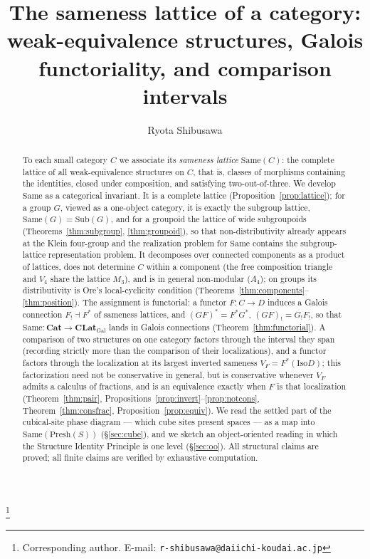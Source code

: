 \documentclass[11pt]{amsart}
\theoremstyle{definition}
\newcommand{\Same}{\mathrm{Same}}
\newcommand{\Sub}{\mathrm{Sub}}
\newcommand{\Iso}{\mathrm{Iso}}
\newcommand{\Fstar}{F^{*}}
\newcommand{\Fshriek}{F_{!}}
\newcommand{\Presh}{\mathrm{Presh}}
\newcommand{\Cat}{\mathbf{Cat}}
\newcommand{\CLatGal}{\mathbf{CLat}_{\mathrm{Gal}}}
\begin{document}
\title[The sameness lattice of a category]{The sameness lattice of a category:
  weak-equivalence structures, Galois functoriality, and comparison intervals}
\author{Ryota Shibusawa}
\thanks{Corresponding author. E-mail: \texttt{r-shibusawa@daiichi-koudai.ac.jp}}
\address{Daiichi Institute of Technology}


\begin{abstract}
To each small category $C$ we associate its \emph{sameness lattice} $\Same(C)$:
the complete lattice of all weak-equivalence structures on $C$, that is, classes
of morphisms containing the identities, closed under composition, and satisfying
two-out-of-three. We develop $\Same$ as a categorical invariant. It is a
complete lattice (Proposition~\ref{prop:lattice}); for a group $G$, viewed as a
one-object category, it is exactly the subgroup lattice, $\Same(G)=\Sub(G)$, and
for a groupoid the lattice of wide subgroupoids (Theorems~\ref{thm:subgroup},
\ref{thm:groupoid}), so that non-distributivity already appears at the Klein
four-group and the realization problem for $\Same$ contains the subgroup-lattice
representation problem. It decomposes over connected components
as a product of lattices, does not determine $C$ within a component (the free
composition triangle and $V_4$ share the lattice $M_3$), and is in general
non-modular ($A_4$); on groups its distributivity is Ore's local-cyclicity
condition (Theorems~\ref{thm:components}--\ref{thm:position}). The assignment is
functorial: a functor
$F\colon C\to D$ induces a Galois connection $\Fshriek\dashv\Fstar$ of sameness
lattices, and $(GF)^{*}=F^{*}G^{*}$, $(GF)_{!}=G_{!}F_{!}$, so that
$\Same\colon\Cat\to\CLatGal$ lands in Galois connections
(Theorem~\ref{thm:functorial}). A comparison of two structures on one category
factors through the interval they span (recording strictly more than the
comparison of their localizations), and a functor factors through the
localization at its largest inverted sameness $V_F=\Fstar(\Iso D)$; this
factorization need not be conservative in general, but is conservative whenever
$V_F$ admits a calculus of fractions, and is an equivalence exactly when $F$ is
that localization (Theorem~\ref{thm:pair},
Propositions~\ref{prop:invert}--\ref{prop:notcons},
Theorem~\ref{thm:consfrac}, Proposition~\ref{prop:equiv}). We read the
settled part of the cubical-site phase diagram --- which cube sites present
spaces --- as a map into $\Same(\Presh(S))$ (\S\ref{sec:cube}), and we sketch an
object-oriented reading in which the Structure Identity Principle is one level
(\S\ref{sec:oo}). All structural claims are proved; all finite claims are
verified by exhaustive computation.
\end{abstract}
\end{document}
